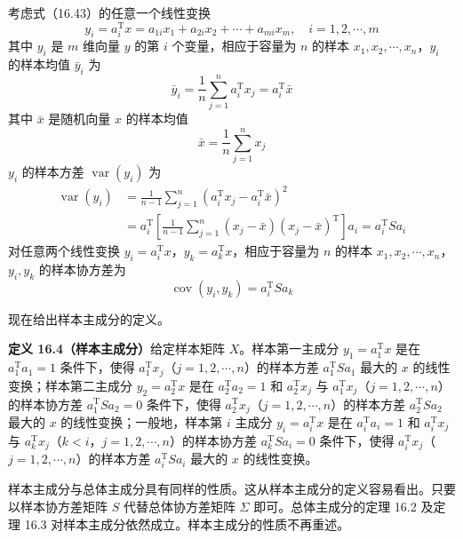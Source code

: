 \documentclass[UTF8, 12pt, fontset=fandol, oneside]{ctexart}
\begin{document}
考虑式（16.43）的任意一个线性变换
\begin{equation}
y_i=a_i^{\mathrm{T}}x=a_{1i}x_1+a_{2i}x_2+\cdots+a_{mi}x_m,\quad i=1,2,\cdots,m
\tag{16.44}
\end{equation}
其中 $y_i$ 是 $m$ 维向量 $y$ 的第 $i$ 个变量，相应于容量为 $n$ 的样本 $x_1,x_2,\cdots,x_n$，$y_i$ 的样本均值 $\bar y_i$ 为
\begin{equation}
\bar y_i=\frac{1}{n}\sum_{j=1}^n a_i^{\mathrm{T}}x_j=a_i^{\mathrm{T}}\bar x
\tag{16.45}
\end{equation}
其中 $\bar x$ 是随机向量 $x$ 的样本均值
\[
\bar x=\frac{1}{n}\sum_{j=1}^n x_j
\]
$y_i$ 的样本方差 $\operatorname{var}(y_i)$ 为
\begin{equation}
\begin{aligned}
\operatorname{var}(y_i)
&=\frac{1}{n-1}\sum_{j=1}^n(a_i^{\mathrm{T}}x_j-a_i^{\mathrm{T}}\bar x)^2\\
&=a_i^{\mathrm{T}}\left[\frac{1}{n-1}\sum_{j=1}^n(x_j-\bar x)(x_j-\bar x)^{\mathrm{T}}\right]a_i
=a_i^{\mathrm{T}}Sa_i
\end{aligned}
\tag{16.46}
\end{equation}
对任意两个线性变换 $y_i=a_i^{\mathrm{T}}x$，$y_k=a_k^{\mathrm{T}}x$，相应于容量为 $n$ 的样本 $x_1,x_2,\cdots,x_n$，$y_i,y_k$ 的样本协方差为
\begin{equation}
\operatorname{cov}(y_i,y_k)=a_i^{\mathrm{T}}Sa_k
\tag{16.47}
\end{equation}

现在给出样本主成分的定义。

\noindent\textbf{定义 16.4（样本主成分）}\quad 给定样本矩阵 $X$。样本第一主成分 $y_1=a_1^{\mathrm{T}}x$ 是在 $a_1^{\mathrm{T}}a_1=1$ 条件下，使得 $a_1^{\mathrm{T}}x_j$（$j=1,2,\cdots,n$）的样本方差 $a_1^{\mathrm{T}}Sa_1$ 最大的 $x$ 的线性变换；样本第二主成分 $y_2=a_2^{\mathrm{T}}x$ 是在 $a_2^{\mathrm{T}}a_2=1$ 和 $a_2^{\mathrm{T}}x_j$ 与 $a_1^{\mathrm{T}}x_j$（$j=1,2,\cdots,n$）的样本协方差 $a_1^{\mathrm{T}}Sa_2=0$ 条件下，使得 $a_2^{\mathrm{T}}x_j$（$j=1,2,\cdots,n$）的样本方差 $a_2^{\mathrm{T}}Sa_2$ 最大的 $x$ 的线性变换；一般地，样本第 $i$ 主成分 $y_i=a_i^{\mathrm{T}}x$ 是在 $a_i^{\mathrm{T}}a_i=1$ 和 $a_i^{\mathrm{T}}x_j$ 与 $a_k^{\mathrm{T}}x_j$（$k<i$，$j=1,2,\cdots,n$）的样本协方差 $a_k^{\mathrm{T}}Sa_i=0$ 条件下，使得 $a_i^{\mathrm{T}}x_j$（$j=1,2,\cdots,n$）的样本方差 $a_i^{\mathrm{T}}Sa_i$ 最大的 $x$ 的线性变换。

样本主成分与总体主成分具有同样的性质。这从样本主成分的定义容易看出。只要以样本协方差矩阵 $S$ 代替总体协方差矩阵 $\Sigma$ 即可。总体主成分的定理 16.2 及定理 16.3 对样本主成分依然成立。样本主成分的性质不再重述。
\end{document}
